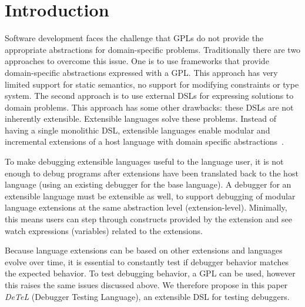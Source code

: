 \section{Introduction}

Software development faces the challenge that \acp{GPL}
do not provide the appropriate abstractions for domain-specific problems. 
Traditionally there are two  
approaches to overcome this issue. One is to use frameworks 
that provide domain-specific abstractions expressed with a \ac{GPL}.
This approach has very limited support for static semantics, \eg 
no support for modifying constraints or type system.
The second approach is to use external \acp{DSL} for 
expressing solutions to domain problems. This approach 
has some other drawbacks: 
these \acp{DSL} are not inherently extensible.
Extensible languages solve these problems. Instead of having a single 
monolithic \ac{DSL}, extensible languages enable modular and 
incremental extensions of a host language with domain specific 
abstractions~\cite{Voelter2011}.

To make debugging extensible languages useful to the language user, it is not
enough to debug programs after extensions have been translated back to the host 
language (using an existing debugger for the base language).  
A debugger for an extensible language must be extensible as well, to support
debugging of modular language extensions at the same abstraction level
(extension-level).
Minimally, this means users can step through constructs 
provided by the extension and see watch expressions (\eg variables) related to
the extensions.

Because language extensions can be based on other extensions and languages
evolve over time, it is essential to constantly test if debugger
behavior matches the expected behavior. To test debugging
behavior, a \ac{GPL} can be used, however this raises
the same issues discussed above. 
We therefore propose in this paper \emph{DeTeL} (Debugger Testing Language), an
extensible \ac{DSL} for testing debuggers. 
